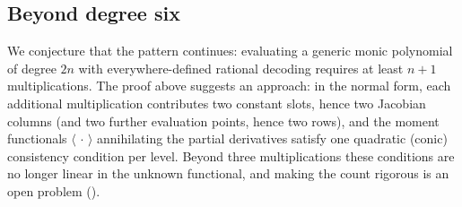 \subsection{Beyond degree six}

We conjecture that the pattern continues: evaluating a generic monic
polynomial of degree $2n$ with everywhere-defined rational decoding requires at least $n+1$
multiplications.  The proof above suggests an approach: in the normal form,
each additional multiplication contributes two constant slots, hence two
Jacobian columns (and two further evaluation points, hence two rows), and the moment
functionals $\langle\,\cdot\,\rangle$ annihilating the partial derivatives
satisfy one quadratic (conic) consistency condition per level.  Beyond three
multiplications these conditions are no longer linear in the unknown
functional, and making the count rigorous is an open problem
().

